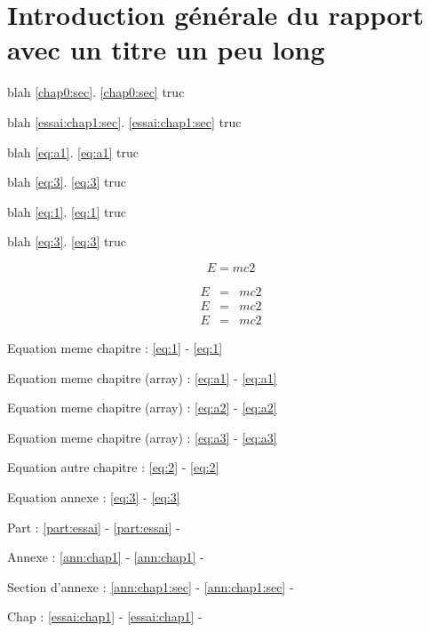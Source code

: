 \documentclass[bare]{polytech/polytech}
\begin{document}
             
\chapter*[Titre court pour l'entête]{Introduction générale du rapport avec un titre un peu long}

\label{sec:0}    
\label{chap0}    


blah \autoref{chap0:sec}. \autoref{chap0:sec} truc

blah \autoref{essai:chap1:sec}. \autoref{essai:chap1:sec} truc

blah \eqref{eq:a1}. \eqref{eq:a1} truc

blah \eqref{eq:3}. \eqref{eq:3} truc

blah \autoref{eq:1}. \autoref{eq:1} truc

blah \autoref{eq:3}. \autoref{eq:3} truc



\begin{equation}
\label{eq:1} 
E=mc2
\end{equation}     

\begin{eqnarray}
\label{eq:a1}
E&=&mc2\\
\label{eq:a2}   
E&=&mc2\\
\label{eq:a3}
E&=&mc2 
\end{eqnarray}          
 
Equation meme chapitre : \autoref{eq:1} - \eqref{eq:1}
 
Equation meme chapitre (array) : \autoref{eq:a1} - \eqref{eq:a1}

Equation meme chapitre (array) : \autoref{eq:a2} - \eqref{eq:a2}

Equation meme chapitre (array) : \autoref{eq:a3} - \eqref{eq:a3}

Equation autre chapitre : \autoref{eq:2} - \eqref{eq:2}


Equation annexe :  \autoref{eq:3}   - \eqref{eq:3}  
      
Part : \ref{part:essai} - \autoref{part:essai} -             
       
Annexe : \ref{ann:chap1} - \autoref{ann:chap1} -               
 
Section d'annexe : \ref{ann:chap1:sec} - \autoref{ann:chap1:sec} -           
 
 Chap : \ref{essai:chap1} - \autoref{essai:chap1} - 
            
\end{document}
